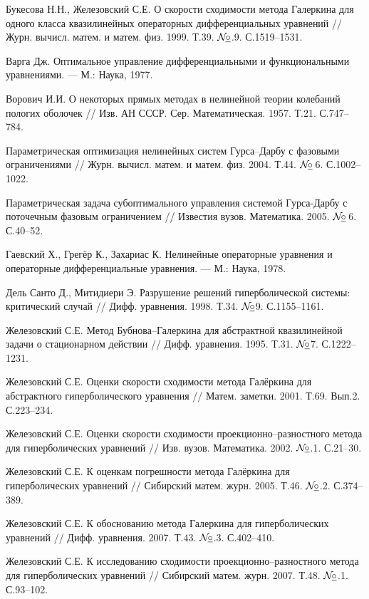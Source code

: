 \documentclass{report}
\newcommand{\No}{${\cal N}{\!}\underline{\circ}$}
\begin{document}
\begin{thebibliography}{99}
 Букесова Н.Н., Железовский С.Е. О скорости сходимости метода Галеркина для одного класса квазилинейных операторных дифференциальных уравнений // Журн. вычисл. матем. и
матем. физ. 1999. Т.39. \No.9. С.1519--1531.

 Варга Дж. Оптимальное управление дифференциальными и функциональными  уравнениями. --- М.: Наука, 1977.

 Ворович И.И. О некоторых прямых методах в нелинейной теории колебаний пологих оболочек // Изв. АН СССР. Сер. Математическая. 1957. Т.21. С.747--784.

 Параметрическая оптимизация нелинейных систем Гурса--Дарбу с фазовыми ограничениями // Журн. вычисл. матем. и матем. физ. 2004. Т.44. \No\,6.
С.1002--1022.

 Параметрическая задача субоптимального управления системой Гурса-Дарбу с поточечным фазовым ограничением // Известия вузов. Математика. 2005.
\No\,6. С.40--52.

 Гаевский Х., Грегёр К., Захариас К. Нелинейные операторные уравнения и операторные дифференциальные уравнения. --- М.: Наука, 1978.

 Дель Санто Д., Митидиери Э. Разрушение решений гиперболической системы: критический случай // Дифф. уравнения. 1998. Т.34. \No9. С.1155--1161.

 Железовский С.Е. Метод Бубнова--Галеркина для абстрактной квазилинейной задачи о стационарном действии // Дифф. уравнения. 1995. Т.31. \No7. С.1222--1231.

 Железовский С.Е. Оценки скорости сходимости метода Галёркина для абстрактного гиперболического уравнения // Матем. заметки. 2001. Т.69. Вып.2. С.223--234.

 Железовский С.Е. Оценки скорости сходимости проекционно--разностного метода для гиперболических уравнений // Изв. вузов. Математика. 2002. \No.1. С.21--30.

 Железовский С.Е. К оценкам погрешности метода Галёркина для гиперболических уравнений // Сибирский матем. журн. 2005. Т.46. \No.2. С.374--389.

 Железовский С.Е. К обоснованию метода Галеркина для гиперболических уравнений // Дифф. уравнения. 2007. Т.43. \No.3. С.402--410.

 Железовский С.Е. К исследованию сходимости проекционно--разностного метода для гиперболических уравнений // Сибирский матем. журн. 2007. Т.48. \No.1. С.93--102.


\end{thebibliography}
\end{document}
